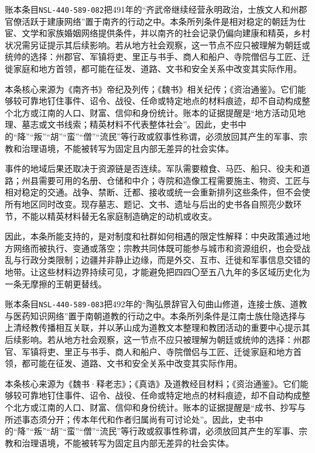 账本条目\texttt{NSL-440-589-082}把491年的“齐武帝继续经营永明政治，士族文人和州郡官僚活跃于建康网络”置于南齐的行动之中。本条所列条件是相对稳定的朝廷为仕宦、文学和家族婚姻网络提供条件，并以南齐的社会记录仍偏向建康和精英，乡村状况需另证提示其后续影响。若从地方社会观察，这一节点不应只被理解为朝廷或统帅的选择：州郡官、军镇将吏、里正与书手、商人和船户、寺院僧侣与工匠、迁徙家庭和地方首领，都可能在征发、道路、文书和安全关系中改变其实际作用。

本条核心来源为《南齐书》帝纪及列传；《魏书》相关纪传；《资治通鉴》。它们能够较可靠地钉住事件、诏令、战役、任命或特定地点的材料痕迹，却不自动构成整个北方或江南的人口、财富、信仰和身份统计。账本的证据提醒是“地方活动见地理、墓志或文书线索；精英材料不代表整体社会”。因此，史书中的“降”“叛”“胡”“蛮”“僧”“流民”等行政或叙事性称谓，必须放回其产生的军事、宗教和治理语境，不能被转写为固定且内部无差异的社会实体。

事件的地域后果还取决于资源链是否连续。军队需要粮食、马匹、船只、役夫和道路；州县需要可用的名册、仓储和中介；寺院和造像工程需要施主、物资、工匠与相对稳定的交通。战争、禁断、迁都、接收或统一会重新排列这些条件，但不会使所有地区同时改变。现存墓志、题记、文书、遗址与后出的史书各自照亮少数环节，不能以精英材料替无名家庭制造确定的动机或收支。

因此，本条所能支持的，是对制度和社群如何相遇的限定性解释：中央政策通过地方网络而被执行、变通或落空；宗教共同体既可能参与城市和资源组织，也会受战乱与行政分类限制；边疆并非静止边缘，而是外交、互市、迁徙和军事信息交错的地带。让这些材料边界持续可见，才能避免把四四〇至五八九年的多区域历史化为一条无摩擦的王朝更替线。

账本条目\texttt{NSL-440-589-083}把492年的“陶弘景辞官入句曲山修道，连接士族、道教与医药知识网络”置于南朝道教的行动之中。本条所列条件是江南士族仕隐选择与上清经教传播相互关联，并以茅山成为道教文本整理和教团活动的重要中心提示其后续影响。若从地方社会观察，这一节点不应只被理解为朝廷或统帅的选择：州郡官、军镇将吏、里正与书手、商人和船户、寺院僧侣与工匠、迁徙家庭和地方首领，都可能在征发、道路、文书和安全关系中改变其实际作用。

本条核心来源为《魏书·释老志》；《真诰》及道教经目材料；《资治通鉴》。它们能够较可靠地钉住事件、诏令、战役、任命或特定地点的材料痕迹，却不自动构成整个北方或江南的人口、财富、信仰和身份统计。账本的证据提醒是“成书、抄写与所述事态须分开；传本年代和作者归属尚有可讨论处”。因此，史书中的“降”“叛”“胡”“蛮”“僧”“流民”等行政或叙事性称谓，必须放回其产生的军事、宗教和治理语境，不能被转写为固定且内部无差异的社会实体。

